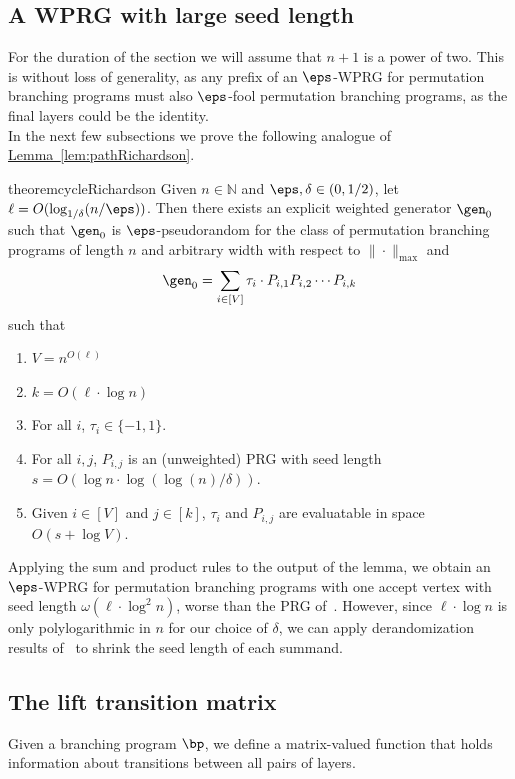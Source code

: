 \documentclass[11pt]{article}
\newcommand{\expref}[2]{\texorpdfstring{\hyperref[#2]{#1~\ref{#2}}}{#1~\ref{#2}}}
\newcommand{\N}{{\mathbb N}}
\begin{document}
\subsection{A WPRG with large seed length}
For the duration of the section we will assume that $n+1$ is a power of two. This is without loss of generality, as any prefix of an $\eps$-WPRG for permutation branching programs must also $\eps$-fool permutation branching programs, as the final layers could be the identity.\\ 

In the next few subsections we prove the following analogue of 
\expref{Lemma}{lem:pathRichardson}. %
\begin{restatable}{theorem}{cycleRichardson}
\label{thm:cycleRichardson}
Given $n \in \N$ and $\eps,\delta \in (0,1/2)$, let $\ell=O( \log_{1/\delta}(n/\eps))$. 
Then there exists an explicit weighted generator $\gen_0$ such that $\gen_0$ is $\eps$-pseudorandom for the class of permutation branching programs of length $n$ and arbitrary width with respect to $\|\cdot\|_{\max}$ and 
\[\gen_0 = \sum_{i\in [V]}\tau_i\cdot P_{i,1}P_{i,2}\cdots P_{i,k}\]
such that %
\begin{enumerate}
    \item $V=n^{O(\ell)}$
    \item $k=O(\ell\cdot \log n)$
    \item For all $i$, $\tau_i\in \{-1,1\}$.
    \item For all $i,j$, $P_{i,j}$ is an (unweighted) PRG with seed length $s=O(\log n \cdot\log(\log(n)/\delta))$.
    \item Given $i\in [V]$ and $j\in [k]$, $\tau_i$ and $P_{i,j}$ are evaluatable in space $O(s+\log V)$.
\end{enumerate}
\end{restatable}

Applying the sum and product rules to the output of the lemma, we obtain an $\eps$-WPRG for permutation branching programs with one accept vertex with seed length $\omega(\ell\cdot \log^2 n)$, worse than the PRG of~\cite{HozaPyVa21}. However, since $\ell\cdot \log n$ is only polylogarithmic in $n$ for our choice of $\delta$, we can apply derandomization results of~\cite{HozaPyVa21} to shrink the seed length of each summand. 

\subsection{The lift transition matrix}
Given a branching program $\bp$, we define a %
matrix-valued %
function that holds information about transitions between all pairs of layers.
\end{document}
